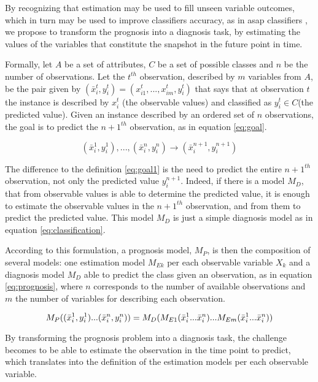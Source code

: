 By recognizing that estimation may be used to fill unseen variable outcomes, which in turn may be used to improve classifiers
 accuracy, as in asap classifiers \cite{Antunes2010}, we propose to transform the prognosis into a diagnosis task, by estimating the values
 of the variables that constitute the snapshot in the future point in time.

Formally, let $A$ be a set of attributes, $C$ be a set of possible classes and $n$ be the number of observations. Let the $t^{th}$ observation,
 described by $m$ variables from $A$, be the pair given by $(\bar{x}_i^t,y_i^t)=(x_{i1}^t,...,x_{im}^t,y_i^t)$ that says that at observation $t$
 the instance is described by $x_i^t$ (the observable values) and classified as $y_i^t \in C$(the predicted value). Given an instance 
 described by an ordered set of $n$ observations, the goal is to predict the ${n+1}^{th}$ observation, as in equation \ref{eq:goal}.

\begin{equation}
	(\bar{x}_i^1,y_i^1 ),...,(\bar{x}_i^n,y_i^n ) \rightarrow (\bar{x}_i^{n+1}, y_i^{n+1})
\label{eq:goal}
\end{equation}

The difference to the definition \ref{eq:goal1} is the need to predict the entire ${n+1}^{th}$ observation, not only the predicted 
value $y_i^{n+1}$. Indeed, if there is a model $M_D$, that from observable values is able to determine the predicted value, it is 
enough to estimate the observable values in the ${n+1}^{th}$ observation, and from them to predict the predicted value. This model $M_D$ is
 just a simple diagnosis model as in equation \ref{eq:classification}.

 According to this formulation, a prognosis model, $M_P$, is then the composition of several models: one estimation model $M_{Ek}$ per each 
 observable variable $X_k$ and a diagnosis model $M_D$ able to predict the class given an observation, as in equation \ref{eq:prognosis}, where $n$ corresponds 
 to the number of available observations and $m$ the number of variables for describing each observation.

\begin{equation}
	M_P ((\bar{x}_i^1,y_i^1 )\space...\space(\bar{x}_i^n,y_i^n )) = M_D (M_{E1} (\bar{x}_i^1 \space...\space \bar{x}_i^n ) \space...\space M_{Em}
	(\bar{x}_i^1 \space...\space \bar{x}_i^n ))
\label{eq:prognosis}
\end{equation}

By transforming the prognosis problem into a diagnosis task, the challenge becomes to be able to estimate the observation in the
 time point to predict, which translates into the definition of the estimation models per each observable variable.

